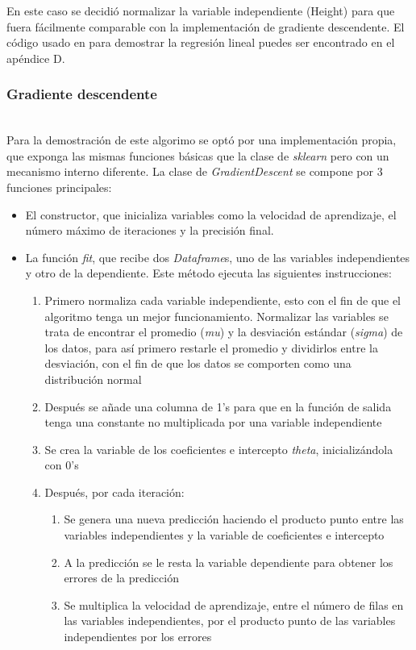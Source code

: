 \documentclass[sigconf,authorversion,nonacm]{acmart}
\begin{document}
En este caso se decidió normalizar la variable independiente (Height) para que fuera fácilmente comparable con la implementación de gradiente descendente. El código usado en para demostrar la regresión lineal puedes ser encontrado en el apéndice D.

\subsubsection{Gradiente descendente}\hfill\\
Para la demostración de este algorimo se optó por una implementación propia, que exponga las mismas funciones básicas que la clase de \textit{sklearn} pero con un mecanismo interno diferente. La clase de \textit{GradientDescent} se compone por 3 funciones principales:
\begin{itemize}
  \item El constructor, que inicializa variables como la velocidad de aprendizaje, el número máximo de iteraciones y la precisión final.
  \item La función \textit{fit}, que recibe dos \textit{Dataframe}s, uno de las variables independientes y otro de la dependiente. Este método ejecuta las siguientes instrucciones:
  \begin{enumerate}
    \item Primero normaliza cada variable independiente, esto con el fin de que el algoritmo tenga un mejor funcionamiento. Normalizar las variables se trata de encontrar el promedio (\textit{mu}) y la desviación estándar (\textit{sigma}) de los datos, para así primero restarle el promedio y dividirlos entre la desviación, con el fin de que los datos se comporten como una distribución normal
    \item Después se añade una columna de 1's para que en la función de salida tenga una constante no multiplicada por una variable independiente
    \item Se crea la variable de los coeficientes e intercepto \textit{theta}, inicializándola con 0's
    \item Después, por cada iteración:
    \begin{enumerate}
      \item Se genera una nueva predicción haciendo el producto punto entre las variables independientes y la variable de coeficientes e intercepto
      \item A la predicción se le resta la variable dependiente para obtener los errores de la predicción
      \item Se multiplica la velocidad de aprendizaje, entre el número de filas en las variables independientes, por el producto punto de las variables independientes por los errores

\end{enumerate}
\end{enumerate}
\end{itemize}
\end{document}
